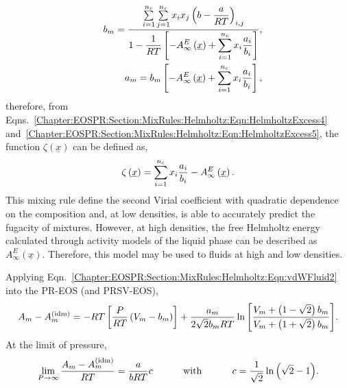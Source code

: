    \begin{eqnarray}
     && b_{m} = \frc{\sum\limits_{i=1}^{n_{c}}\sum\limits_{j=1}^{n_{c}}x_{i}x_{j}\left(b-\frc{a}{RT}\right)_{i,j}}{1 - \frc{1}{RT}\left[-A_{\infty}^{E}\left(\underline{x}\right) + \sum\limits_{i=1}^{n_{c}} x_{i}\frc{a_{i}}{b_{i}}\right]},\label{Chapter:EOSPR:Section:MixRules:Helmholtz:Eqn:HelmholtzExcess6} \\
     && a_{m} = b_{m}\left[-A_{\infty}^{E}\left(\underline{x}\right) + \sum\limits_{i=1}^{n_{c}} x_{i}\frc{a_{i}}{b_{i}}\right],\label{Chapter:EOSPR:Section:MixRules:Helmholtz:Eqn:HelmholtzExcess7}
   \end{eqnarray}
therefore, from Eqns.~\ref{Chapter:EOSPR:Section:MixRules:Helmholtz:Eqn:HelmholtzExcess4} and~\ref{Chapter:EOSPR:Section:MixRules:Helmholtz:Eqn:HelmholtzExcess5}, the function $\zeta\left(\underline{x}\right)$ can be defined as,
   \begin{equation}
     \zeta\left(\underline{x}\right) = \sum\limits_{i=1}^{n_{c}}x_{i}\frc{a_{i}}{b_{i}} - A_{\infty}^{E}\left(\underline{x}\right).
   \end{equation}
This mixing rule define the second Virial coefficient with quadratic dependence on the composition and, at low densities, is able to accurately predict the fugacity of mixtures. However, at high densities, the free Helmholtz energy calculated through activity models of the liquid phase can be described as $A_{\infty}^{E}\left(\underline{x}\right)$. Therefore, this model may be used to fluids at high and low densities.

Applying Eqn.~\ref{Chapter:EOSPR:Section:MixRules:Helmholtz:Eqn:vdWFluid2} into the PR-EOS (and PRSV-EOS),
   \begin{equation}
      A_{m} - \mfr[A]{m}{\text{idm}} = -RT\left[\frc{P}{RT}\left(V_{m}-b_{m}\right)\right] + \frc{a_{m}}{2\sqrt{2}b_{m}RT}\ln{\left[\frc{V_{m}+\left(1-\sqrt{2}\right)b_{m}}{V_{m}+\left(1+\sqrt{2}\right)b_{m}}\right]}.\label{Chapter:EOSPR:Section:MixRules:Helmholtz:Eqn:HelmholtzExcess8}
   \end{equation}
At the limit of pressure,
   \begin{equation}
     \lim_{P\rightarrow\infty}\frc{A_{m}-\mfr[A]{m}{\text{idm}}}{RT} = \frc{a}{bRT}c\hspace{1cm}\text{ with }\hspace{1cm} c = \frc{1}{\sqrt{2}}\ln{\left(\sqrt{2}-1\right)}.\label{Chapter:EOSPR:Section:MixRules:Helmholtz:Eqn:HelmholtzExcess9}
   \end{equation}

